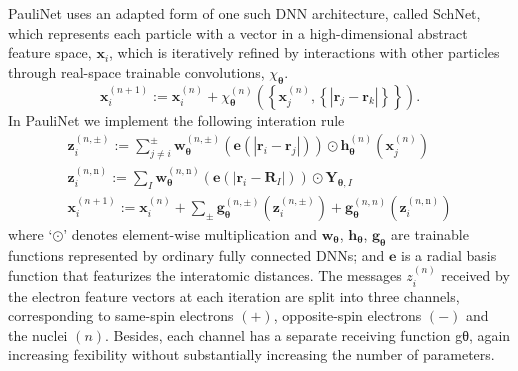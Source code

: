\documentclass[12pt]{article}
\begin{document}
PauliNet uses an adapted form of one such DNN architecture, called SchNet, which  
represents each particle with a vector in a high-dimensional abstract 
feature space, $\mathbf{x}_i$, which is iteratively refined by interactions with 
other particles through real-space trainable convolutions, $\chi_{\boldsymbol{\theta}}$.
\begin{equation}
    \mathbf{x}_{i}^{(n+1)}:=\mathbf{x}_{i}^{(n)}+\chi_{\boldsymbol{\theta}}^{(n)}\left(\left
    \{\mathbf{x}_{j}^{(n)},\left\{\left|\mathbf{r}_j-\mathbf{r}_{k}\right|\right\}
    \right\}\right).
\end{equation}
In PauliNet we implement the following interation rule
\begin{equation}
    \begin{array}{l}
        \mathbf{z}_i^{(n,\pm)}:=\sum_{j\neq i}^\pm\mathbf{w}_{\boldsymbol{\theta}}^{(n,\pm)}
        \left(\mathbf{e}\left(\left|\mathbf{r}_i-\mathbf{r}_j\right|\right)\right)
        \odot \mathbf{h}_{\boldsymbol{\theta}}^{(n)}\left(\mathbf{x}_{j}^{(n)}\right)\\
        \mathbf{z}_i^{(n,\mathrm{n})}:=\sum_I\mathbf{w}_{\boldsymbol{\theta}}^{(n,\mathrm{n})}
        \left(\mathbf{e}\left(\left|\mathbf{r}_i-\mathbf{R}_I\right|\right)\right)
        \odot \mathbf{Y}_{\boldsymbol{\theta}, I}\\
        \mathbf{x}_i^{(n+1)}:=\mathbf{x}_i^{(n)}+\sum_\pm\mathbf{g}_{\boldsymbol{\theta}}^{(n,\pm)}
        \left(\mathbf{z}_i^{(n,\pm)}\right)+\mathbf{g}_{\boldsymbol{\theta}}^{(n,n)}
        \left(\mathbf{z}_{i}^{(n,\mathrm{n})}\right)
        \end{array}
\end{equation}
where `$\odot$' denotes element-wise multiplication and $\mathbf{w}_{\boldsymbol{\theta}}$, 
$\mathbf{h}_{\boldsymbol{\theta}}$, $\mathbf{g}_{\boldsymbol{\theta}}$ are trainable functions represented by 
ordinary fully connected DNNs; and $\mathbf{e}$ is a radial basis function that 
featurizes the interatomic distances. The messages $z_i^{(n)}$ received by the 
electron feature vectors at each iteration are split into three channels, 
corresponding to same-spin electrons $(+)$, opposite-spin electrons $(−)$ and 
the nuclei $(n)$. Besides, each channel has a separate receiving function gθ, 
again increasing fexibility without substantially increasing the number of 
parameters.
\end{document}
